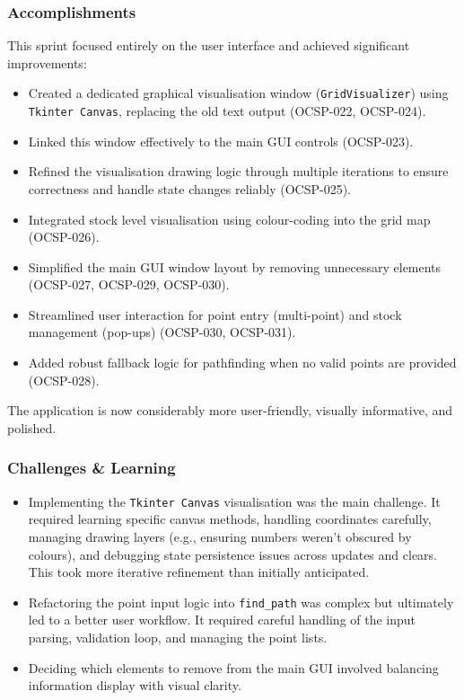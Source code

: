 \subsubsection{Accomplishments}
This sprint focused entirely on the user interface and achieved significant improvements:
\begin{itemize}
	\item Created a dedicated graphical visualisation window (\verb|GridVisualizer|) using \verb|Tkinter Canvas|, replacing the old text output (OCSP-022, OCSP-024).
	\item Linked this window effectively to the main GUI controls (OCSP-023).
	\item Refined the visualisation drawing logic through multiple iterations to ensure correctness and handle state changes reliably (OCSP-025).
	\item Integrated stock level visualisation using colour-coding into the grid map (OCSP-026).
	\item Simplified the main GUI window layout by removing unnecessary elements (OCSP-027, OCSP-029, OCSP-030).
	\item Streamlined user interaction for point entry (multi-point) and stock management (pop-ups) (OCSP-030, OCSP-031).
	\item Added robust fallback logic for pathfinding when no valid points are provided (OCSP-028).
\end{itemize}
The application is now considerably more user-friendly, visually informative, and polished.

\subsubsection{Challenges \& Learning}
\begin{itemize}
	\item Implementing the \verb|Tkinter Canvas| visualisation was the main challenge. It required learning specific canvas methods, handling coordinates carefully, managing drawing layers (e.g., ensuring numbers weren't obscured by colours), and debugging state persistence issues across updates and clears. This took more iterative refinement than initially anticipated.
	\item Refactoring the point input logic into \verb|find_path| was complex but ultimately led to a better user workflow. It required careful handling of the input parsing, validation loop, and managing the point lists.
	\item Deciding which elements to remove from the main GUI involved balancing information display with visual clarity.
\end{itemize}

